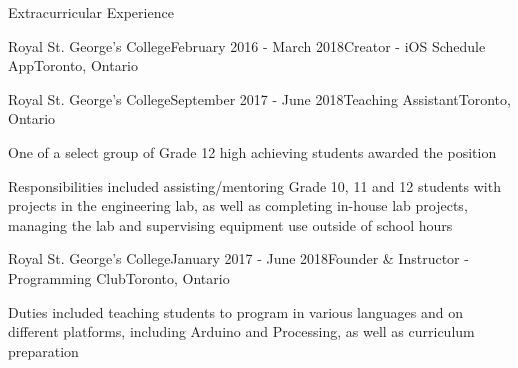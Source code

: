 \documentclass{resume} %
\begin{document}
\begin{rSection}{Extracurricular Experience}
\begin{rSubsection}{Royal St. George's College}{February 2016 - March
    2018}{Creator - iOS Schedule App}{Toronto, Ontario}
\end{rSubsection}

\begin{rSubsection}{Royal St. George's College}{September 2017 - June
    2018}{Teaching Assistant}{Toronto, Ontario}
\item One of a select group of Grade 12 high achieving students awarded the position
\item Responsibilities included assisting/mentoring Grade 10, 11 and 12 students with projects in
  the engineering lab, as well as completing in-house lab projects, managing the lab and
  supervising equipment use outside of school hours
\end{rSubsection}

\begin{rSubsection}{Royal St. George's College}{January 2017 - June
    2018}{Founder \& Instructor - Programming Club}{Toronto, Ontario}
\item Duties included teaching students to program in various languages and on different
  platforms, including Arduino and Processing, as well as curriculum preparation
\end{rSubsection}

\end{rSection}
\end{document}
